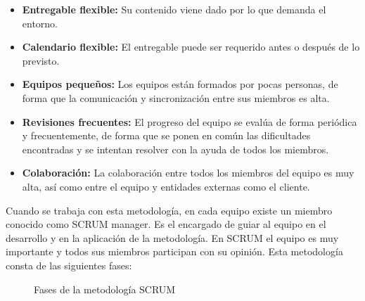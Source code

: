 \begin{itemize}
    \item \textbf{Entregable flexible:} Su contenido viene dado por lo que demanda el entorno. 
    \item \textbf{Calendario flexible:} El entregable puede ser requerido antes o después de lo previsto.
    \item \textbf{Equipos pequeños:} Los equipos están formados por pocas personas, de forma que la comunicación y sincronización entre sus miembros es alta. 
    \item \textbf{Revisiones frecuentes:} El progreso del equipo se evalúa de forma periódica y frecuentemente, de forma que se ponen en común las dificultades encontradas y se intentan resolver con la ayuda de todos los miembros.
    \item \textbf{Colaboración:} La colaboración entre todos los miembros del equipo es muy alta, así como entre el equipo y entidades externas como el cliente.
\end{itemize}

Cuando se trabaja con esta metodología, en cada equipo existe un miembro conocido como SCRUM manager. Es el encargado de guiar al equipo en el desarrollo y en la aplicación de la metodología. En SCRUM el equipo es muy importante y todos sus miembros participan con su opinión. Esta metodología consta de las siguientes fases:


\begin{figure}[H]
    \centering
        \caption{Fases de la metodología SCRUM \cite{schwaber1997scrum}} \label{fig:figura1}
    \end{figure}

